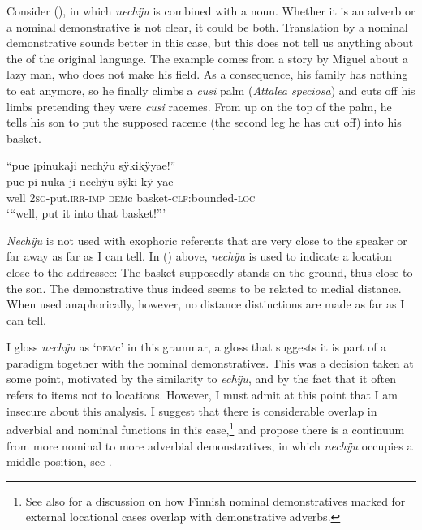 Consider (), in which \textit{nechÿu} is combined with a noun. Whether it is an adverb or a nominal demonstrative is not clear, it could be both. Translation by a nominal demonstrative sounds better in this case, but this does not tell us anything about the  of the original language. The example comes from a story by Miguel about a lazy man, who does not make his field. As a consequence, his family has nothing to eat anymore, so he finally climbs a \textit{cusi} palm (\textit{Attalea speciosa}) and cuts off his limbs pretending they were \textit{cusi} racemes. From up on the top of the palm, he tells his son to put the supposed raceme (the second leg he has cut off) into his basket.

\ea\label{ex:demC-4}
\begingl
\glpreamble “pue ¡pinukaji nechÿu sÿkikÿyae!”\\
\gla pue pi-nuka-ji nechÿu sÿki-kÿ-yae\\
\glb well 2\textsc{sg}-put.\textsc{irr}-\textsc{imp} \textsc{dem}c basket-\textsc{clf:}bounded-\textsc{loc}\\
\glft ‘“well, put it into that basket!”’
\endgl
\trailingcitation{[mox-n110920l.107]}
\xe

\textit{Nechÿu} is not used with exophoric referents that are very close to the speaker or far away as far as I can tell. In () above, \textit{nechÿu} is used to indicate a location close to the addressee: The basket supposedly stands on the ground, thus close to the son. The demonstrative thus indeed seems to be related to medial distance. When used anaphorically, however, no distance distinctions are made as far as I can tell.

I gloss \textit{nechÿu} as ‘\textsc{dem}c’  in this grammar, a gloss that suggests it is part of a paradigm together with the nominal demonstratives. This was a decision taken at some point, motivated by the similarity to \textit{echÿu}, and by the fact that it often refers to items not to locations. However, I must admit at this point that I am insecure about this analysis. I suggest that there is considerable overlap in adverbial and nominal functions in this case,\footnote{See also \citet[75--78]{Diessel1999} for a discussion on how Finnish nominal demonstratives marked for external locational cases overlap with demonstrative adverbs.} and propose there is a continuum from more nominal to more adverbial demonstratives, in which \textit{nechÿu} occupies a middle position, see .

